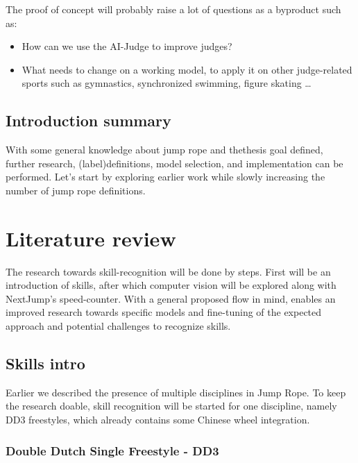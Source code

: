 The proof of concept will probably raise a lot of questions as a byproduct such as:

\begin{itemize}
    \item How can we use the AI-Judge to improve judges?
    \item What needs to change on a working model, to apply it on other judge-related sports such as gymnastics, synchronized swimming, figure skating \dots
\end{itemize}


\subsection{Introduction summary}
\label{subsubsec:intro-summary}

With some general knowledge about jump rope and thethesis goal defined, further research, (label)definitions, model selection, and implementation can be performed.
Let’s start by exploring earlier work while slowly increasing the number of jump rope definitions.



\section{Literature review}%
\label{sec:literature}


The research towards skill-recognition will be done by steps. First will be an introduction of skills, after which computer vision will be explored along with NextJump's speed-counter. With a general proposed flow in mind, enables an improved research towards specific models and fine-tuning of the expected approach and potential challenges to recognize skills.

\subsection{Skills intro}
\label{subsec:literature-basisskills}

Earlier we described the presence of multiple disciplines in Jump Rope. To keep the research doable, skill recognition will be started for one discipline, namely DD3 freestyles, which already contains some Chinese wheel integration.

\subsubsection{Double Dutch Single Freestyle - DD3}
\label{subsubsec:literature-dd3}

